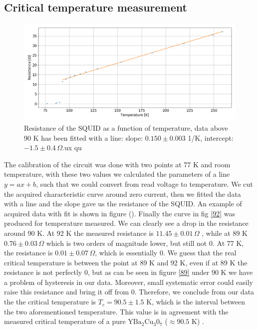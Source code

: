 \documentclass[a4paper,10pt]{article}
\begin{document}
\subsection{Critical temperature measurement}
\begin{figure}[H]
\centering
\includegraphics[width = \textwidth]{img/tempR.png}
\caption{Resistance of the SQUID as a function of temperature, data above 90 K has been fitted with a line: slope: $0.150\pm 0.003$ 1/K, intercept: $-1.5\pm0.4\,\Omega$.ux qu}\label{resistance}
\end{figure}
The calibration of the circuit was done with two points at 77 K and room temperature, with these two values we calculated the parameters of a line $y=ax+b$, such that we could convert from read voltage to temperature. We cut the acquired characteristic curve around zero current, then we fitted the data with a line and the slope gave us the resistance of the SQUID. An example of acquired data with fit is shown in figure (). Finally the curve in fig \ref{92} was produced for temperature measured. We can clearly see a drop in the resistance around 90 K. 
At 92 K the measured resistance is $11.45 \pm  0.01 \, \Omega$ , while at 89 K $0.76\pm 0.03\, \Omega$ which is two orders of magnitude lower, but still not 0. At 77 K, the resistance is
$0.01\pm 0.07\, \Omega$, which is essentially 0. We guess that the real critical temperature is between the point at 89 K and 92 K, even if at 89 K the resistance is not perfectly 0, but as can be seen in figure \ref{89} under 90 K we have a problem of hysteresis in our data. Moreover, small systematic error could easily raise this resistance and bring it off from 0. Therefore, we conclude from our data the the critical temperature is $T_c = 90.5 \pm 1.5$ K, which is the interval between the two aforementioned temperature. This value is in agreement with the measured critical temperature of a pure $\text{YBa}_2\text{Cu}_3\text{0}_7$  ($\approx 90.5$ K) \cite{criticaltemperature}.
\end{document}
